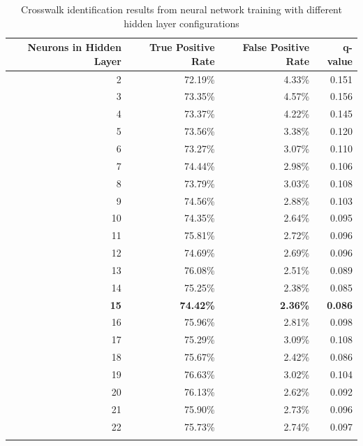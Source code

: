 \documentclass[12pt]{ucthesis}
\begin{document}
    \begin{longtable}{| r | r | r | r |}
    \hline
    Neurons in Hidden Layer & True Positive Rate & False Positive Rate & q-value \bigstrut\\
    \hline
    2  & 72.19\% & 4.33\% & 0.151 \bigstrut\\
    \hline
    3  & 73.35\% & 4.57\% & 0.156 \bigstrut\\
    \hline
    4  & 73.37\% & 4.22\% & 0.145 \bigstrut\\
    \hline
    5  & 73.56\% & 3.38\% & 0.120 \bigstrut\\
    \hline
    6  & 73.27\% & 3.07\% & 0.110 \bigstrut\\
    \hline
    7  & 74.44\% & 2.98\% & 0.106 \bigstrut\\
    \hline
    8  & 73.79\% & 3.03\% & 0.108 \bigstrut\\
    \hline
    9  & 74.56\% & 2.88\% & 0.103 \bigstrut\\
    \hline
    10 & 74.35\% & 2.64\% & 0.095 \bigstrut\\
    \hline
    11 & 75.81\% & 2.72\% & 0.096 \bigstrut\\
    \hline
    12 & 74.69\% & 2.69\% & 0.096 \bigstrut\\
    \hline
    13 & 76.08\% & 2.51\% & 0.089 \bigstrut\\
    \hline
    14 & 75.25\% & 2.38\% & 0.085 \bigstrut\\
    \hline
    \textbf{15} & \textbf{74.42\%} & \textbf{2.36\%} & \textbf{0.086} \bigstrut\\
    \hline
    16 & 75.96\% & 2.81\% & 0.098 \bigstrut\\
    \hline
    17 & 75.29\% & 3.09\% & 0.108 \bigstrut\\
    \hline
    18 & 75.67\% & 2.42\% & 0.086 \bigstrut\\
    \hline
    19 & 76.63\% & 3.02\% & 0.104 \bigstrut\\
    \hline
    20 & 76.13\% & 2.62\% & 0.092 \bigstrut\\
    \hline
    21 & 75.90\% & 2.73\% & 0.096 \bigstrut\\
    \hline
    22 & 75.73\% & 2.74\% & 0.097 \bigstrut\\
    \hline

    \hline
    \caption{Crosswalk identification results from neural network training with different hidden layer configurations}
    \label{tab:NN-HiddenLayersResultsAPP} 
    \end{longtable}
\end{document}
